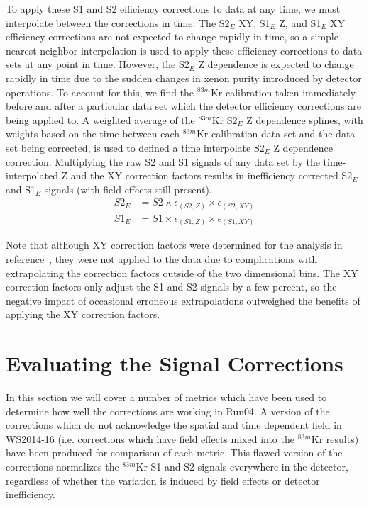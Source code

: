 To apply these S1 and S2 efficiency corrections to data at any time, we must interpolate between the corrections in time.  The S2$_E$ XY, S1$_E$ Z, and S1$_E$ XY efficiency corrections are not expected to change rapidly in time, so a simple nearest neighbor interpolation is used to apply these efficiency corrections to data sets at any point in time.  However, the S2$_E$ Z dependence is expected to change rapidly in time due to the sudden changes in xenon purity introduced by detector operations.  To account for this, we find the $^{83m}$Kr calibration taken immediately before and after a particular data set which the detector efficiency corrections are being applied to.  A weighted average of the $^{83m}$Kr S2$_E$ Z dependence splines, with weights based on the time between each $^{83m}$Kr calibration data set and the data set being corrected, is used to defined a time interpolate S2$_E$ Z dependence correction.  Multiplying the raw S2 and S1 signals of any data set by the time-interpolated Z and the XY correction factors results in inefficiency corrected S2$_E$ and S1$_E$ signals (with field effects still present).
\begin{align}
S2_E &=S2 \times \epsilon_{(S2,Z)} \times \epsilon_{(S2,XY)} \\
S1_E &=S1 \times \epsilon_{(S1,Z)} \times \epsilon_{(S1,XY)}
\end{align}

Note that although XY correction factors were determined for the analysis in reference~\cite{Run4paper}, they were not applied to the data due to complications with extrapolating the correction factors outside of the two dimensional bins.  The XY correction factors only adjust the S1 and S2 signals by a few percent, so the negative impact of occasional erroneous extrapolations outweighed the benefits of applying the XY correction factors.

\section{Evaluating the Signal Corrections} \label{Results}

In this section we will cover a number of metrics which have been used to determine how well the corrections are working in Run04.  A version of the corrections which do not acknowledge the spatial and time dependent field in WS2014-16 (i.e. corrections which have field effects mixed into the $^{83m}$Kr results) have been produced for comparison of each metric. This flawed version of the corrections normalizes the $^{83m}$Kr S1 and S2 signals everywhere in the detector, regardless of whether the variation is induced by field effects or detector inefficiency. 

